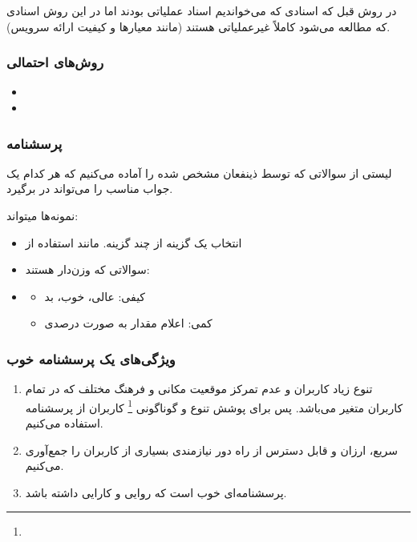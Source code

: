 در روش قبل که اسنادی که می‌خواندیم اسناد عملیاتی بودند اما در این روش اسنادی که
مطالعه می‌شود کاملاً غیرعملیاتی هستند (مانند معیار‌ها و کیفیت ارائه سرویس).

\subsubsection*{روش‌های احتمالی}

\begin{itemize}
    \item {}
    \item {}
\end{itemize}

\subsubsection*{پرسشنامه}

لیستی از سوالاتی که توسط ذینفعان مشخص شده را آماده می‌کنیم که هر کدام یک جواب
مناسب را می‌تواند در برگیرد.

نمونه‌ها میتواند:

\begin{itemize}
    \item انتخاب یک گزینه از چند گزینه. مانند استفاده از 
    \item سوالاتی که وزن‌دار هستند:
    \item \begin{itemize}
        \item کیفی: عالی، خوب، بد
        \item کمی: اعلام مقدار به صورت درصدی
    \end{itemize}
\end{itemize}

\subsubsection*{ویژگی‌های یک پرسشنامه خوب}

\begin{enumerate}
    \item تنوع زیاد کاربران و عدم تمرکز موقعیت مکانی و فرهنگ مختلف که در تمام
    کاربران متغیر می‌باشد. پس برای پوشش تنوع و گوناگونی
    \footnote{} کاربران از پرسشنامه استفاده می‌کنیم.
    \item سریع، ارزان و قابل دسترس از راه دور نیازمندی بسیاری از کاربران را
    جمع‌آوری می‌کنیم.
    \item پرسشنامه‌ای خوب است که روایی و کارایی داشته باشد.
\end{enumerate}

